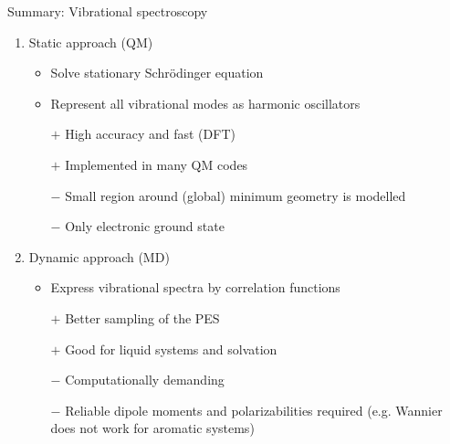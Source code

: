 \documentclass[t]{beamer}
\begin{document}
\begin{frame}{Summary: Vibrational spectroscopy}
	\begin{enumerate}
		\item Static approach (QM)
		      \begin{itemize}
			      \item Solve stationary Schrödinger equation
			      \item Represent all vibrational modes as harmonic oscillators
			      \item[$+$] High accuracy and fast (DFT)
			      \item[$+$] Implemented in many QM codes
			      \item[$-$] Small region around (global) minimum geometry is modelled
			      \item[$-$] Only electronic ground state
		      \end{itemize}
		\item Dynamic approach (MD)
		      \begin{itemize}
			      \item Express vibrational spectra by correlation functions
			      \item[$+$] Better sampling of the PES
			      \item[$+$] Good for liquid systems and solvation
			      \item[$-$] Computationally demanding
			      \item[$-$] Reliable dipole moments and polarizabilities required (e.g. Wannier does not work for aromatic systems)
		      \end{itemize}
	\end{enumerate}
\end{frame}
\end{document}
